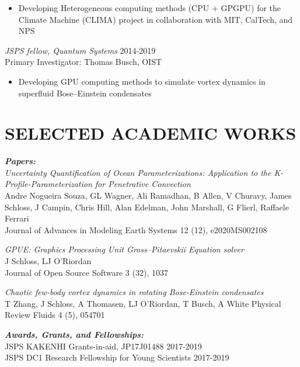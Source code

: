 \documentclass[margin, 10pt, a4paper]{res} %
\begin{document}
\begin{resume}
\begin{itemize}[label = {}] \itemsep -2pt %
\item Developing Heterogeneous computing methods (CPU + GPGPU) for the Climate Machine (CLIMA) project in collaboration with MIT, CalTech, and NPS
\end{itemize}

{\sl JSPS fellow, Quantum Systems} \hfill 2014-2019 \\
Primary Investigator: Thomas Busch, OIST

\begin{itemize}[label = {}] \itemsep -2pt %
\item Developing GPU computing methods to simulate vortex dynamics in superfluid Bose--Einstein condensates
\end{itemize}



\section{SELECTED ACADEMIC WORKS}

{\sl \textbf{Papers:} } \\
  \textit{Uncertainty Quantification of Ocean Parameterizations: Application to the K-Profile-Parameterization for Penetrative Convection} \\
  Andre Nogueira Souza, GL Wagner, Ali Ramadhan, B Allen, V Churavy, James Schloss, J Campin, Chris Hill, Alan Edelman, John Marshall, G Flierl, Raffaele Ferrari \\
  Journal of Advances in Modeling Earth Systems 12 (12), e2020MS002108
  
  \textit{GPUE: Graphics Processing Unit Gross--Pitaevskii Equation solver} \\
  J Schloss, LJ O'Riordan \\
  Journal of Open Source Software 3 (32), 1037
  
  \textit{Chaotic few-body vortex dynamics in rotating Bose-Einstein condensates} \\
  T Zhang, J Schloss, A Thomasen, LJ O'Riordan, T Busch, A White
  Physical Review Fluids 4 (5), 054701
 
 {\sl \textbf{Awards, Grants, and Fellowships:}} \\
 JSPS KAKENHI Grants-in-aid, JP17J01488 \hfill 2017-2019 \\
 JSPS DC1 Research Fellowship for Young Scientists \hfill 2017-2019\\


\end{resume}
\end{document}
